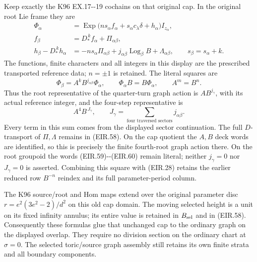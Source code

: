 Keep exactly the K96 EX.17-\/-19 cochains on that original cap.
In the original root Lie frame they are
\[
 \begin{aligned}
 \Phi_\alpha&=
 \operatorname{Exp}\bigl(ns_\alpha f_\alpha
              +s_\alpha c_\lambda\delta+h_\alpha\bigr)I_{z_\alpha},\\
 f_\beta&=D_*^{\,k}f_\alpha+\Pi_{\alpha\beta},\\
 h_\beta-D_*^{\,k}h_\alpha
   &=-ns_\alpha\Pi_{\alpha\beta}
          +j_{\alpha\beta}\operatorname{Log}_\beta B
          +\Lambda_{\alpha\beta},\qquad
 s_\beta=s_\alpha+k .
 \end{aligned}
 \tag{EIR.58}
\]
The functions, finite characters and all integers in this display
are the prescribed transported reference data; \(n=\pm1\) is
retained. The literal squares are
\[
 \Phi_\beta=A^kB^{j_{\alpha\beta}}\Phi_\alpha,\qquad
 \Phi_\alpha B=B\Phi_\alpha,\qquad A^m=B^n .
 \tag{EIR.59}
\]
Thus the root representative of the quarter-turn graph action is
\(AB^{j_\gamma}\), with its actual reference integer, and the
four-step representative is
\[
 A^4 B^{\,J_\gamma},\qquad
 J_\gamma=\sum_{\text{four traversed sectors}}j_{\alpha\beta}.
 \tag{EIR.60}
\]
Every term in this sum comes from the displayed sector continuation.
The full \(D\)-transport of \(\Pi,\Lambda\) remains in (EIR.58).
On the cap quotient the \(A,B\) deck words are identified, so
this is precisely the finite fourth-root graph action there.
On the root groupoid the words (EIR.59)-\/-(EIR.60) remain literal;
neither \(j_\gamma=0\) nor \(J_\gamma=0\) is asserted.
Combining this square with (EIR.28) retains the earlier reduced
row \(B^{-n}\) reindex and its full parameter-period column.

The K96 source/root and Hom maps extend over the original
parameter disc \(r=e^2(3e^2-2)/d^2\) on this old cap domain.
The moving selected height is a unit on its fixed infinity
annulus; its entire value is retained in \(B_{\rm sel}\) and
in (EIR.58). Consequently these formulas glue that unchanged
cap to the ordinary graph on the displayed overlap. They
require no division section on the ordinary chart at
\(\sigma=0\). The selected toric/source graph assembly still
retains its own finite strata and all boundary components.

